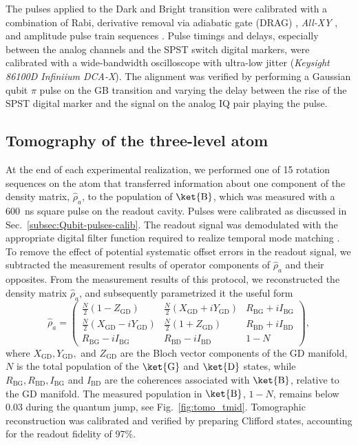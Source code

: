 The pulses applied to the Dark and Bright transition were calibrated
with a combination of Rabi, derivative removal via adiabatic gate
(DRAG) \citep{JChow2010-DRAG}, \emph{All-XY} \citep{Reed2013}, and
amplitude pulse train sequences \citep{Bylander2011}. Pulse timings
and delays, especially between the analog channels and the SPST switch
digital markers, were calibrated with a wide-bandwidth oscilloscope
with ultra-low jitter (\emph{Keysight 86100D Infiniium DCA-X}). The
alignment was verified by performing a Gaussian qubit $\pi$ pulse
on the GB transition and varying the delay between the rise of the
SPST digital marker and the signal on the analog IQ pair playing the
pulse. 


\subsection{Tomography of the three-level atom\label{subsec:Tomography-of-three-level}}

At the end of each experimental realization, we performed one of 15
rotation sequences on the atom that transferred information about
one component of the density matrix, $\hat{\rho}_{a}$, to the population
of $\ket{\mathrm{B}}$, which was measured with a 600~ns square pulse
on the readout cavity. Pulses were calibrated as discussed in Sec.~\ref{subsec:Qubit-pulses-calib}.
The readout signal was demodulated with the appropriate digital filter
function required to realize temporal mode matching \citep{Eichler2012-itinerant-entanglement}.
To remove the effect of potential systematic offset errors in the
readout signal, we subtracted the measurement results of operator
components of $\hat{\rho}_{a}$ and their opposites. From the measurement
results of this protocol, we reconstructed the density matrix $\hat{\rho}_{a}$,
and subsequently parametrized it the useful form 
\begin{equation}
\hat{\rho}_{a}=\begin{pmatrix}\frac{N}{2}\left(1-Z_{\mathrm{GD}}\right) & \frac{N}{2}\left(X_{\mathrm{GD}}+iY_{\mathrm{GD}}\right) & R_{\mathrm{BG}}+iI_{\mathrm{BG}}\\
\frac{N}{2}\left(X_{\mathrm{GD}}-iY_{\mathrm{GD}}\right) & \frac{N}{2}\left(1+Z_{\mathrm{GD}}\right) & R_{\mathrm{BD}}+iI_{\mathrm{BD}}\\
R_{\mathrm{BG}}-iI_{\mathrm{BG}} & R_{\mathrm{BD}}-iI_{\mathrm{BD}} & 1-N
\end{pmatrix},\label{eq:rhoa}
\end{equation}
where $X_{\mathrm{GD}},Y_{\mathrm{GD}},$ and $Z_{\mathrm{GD}}$ are
the Bloch vector components of the GD manifold, $N$ is the total
population of the $\ket{\mathrm{G}}$ and $\ket{\mathrm{D}}$ states,
while $R_{\mathrm{BG}},R_{\mathrm{BD}},I_{\mathrm{BG}}$ and $I_{\mathrm{BD}}$
are the coherences associated with $\ket{\mathrm{B}}$, relative to
the GD manifold. The measured population in $\ket{\mathrm{B}}$, $1-N$,
remains below 0.03 during the quantum jump, see Fig.~\ref{fig:tomo_tmid}.
Tomographic reconstruction was calibrated and verified by preparing
Clifford states, accounting for the readout fidelity of 97\%.

